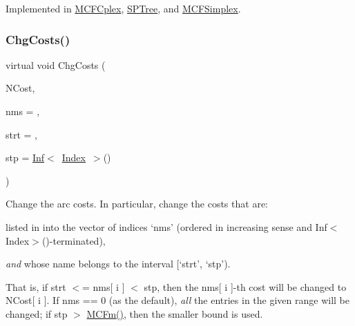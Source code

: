 Implemented in \mbox{\hyperlink{class_m_c_f_cplex_a5b694b932ddb1fc61d9f3d66aaca10e1}{M\+C\+F\+Cplex}}, \mbox{\hyperlink{class_s_p_tree_a5b694b932ddb1fc61d9f3d66aaca10e1}{S\+P\+Tree}}, and \mbox{\hyperlink{class_m_c_f_simplex_a5b694b932ddb1fc61d9f3d66aaca10e1}{M\+C\+F\+Simplex}}.

\mbox{\label{class_m_c_f_class_aedaaa3c7820183c210ff8b1cc716c27d}} 
\subsubsection{\texorpdfstring{Chg\+Costs()}{ChgCosts()}}
{\footnotesize\ttfamily virtual void Chg\+Costs (\begin{DoxyParamCaption}\item[{\mbox{\hyperlink{class_m_c_f_class_ab700102e9ba8bb6015be6818d4e99097}{c\+C\+Row}}}]{N\+Cost,  }\item[{\mbox{\hyperlink{class_m_c_f_class_a81575b2d4e4d5636b17170432150ae69}{c\+Index\+\_\+\+Set}}}]{nms = {},  }\item[{\mbox{\hyperlink{class_m_c_f_class_a76aaabb20535c51a2752b93f6c38fe54}{c\+Index}}}]{strt = {},  }\item[{\mbox{\hyperlink{class_m_c_f_class_ad53d6229d7ec28555a9c9c2fd9abf773}{Index}}}]{stp = {\ttfamily \mbox{\hyperlink{class_o_p_ttypes__di__unipi__it_1_1_inf}{Inf}}$<$~\mbox{\hyperlink{class_m_c_f_class_ad53d6229d7ec28555a9c9c2fd9abf773}{Index}}~$>$()} }\end{DoxyParamCaption})\hspace{0.3cm}{\ttfamily [pure virtual]}}

Change the arc costs. In particular, change the costs that are\+:


\begin{DoxyItemize}
\item listed in into the vector of indices `nms' (ordered in increasing sense and Inf$<$\+Index$>$()-\/terminated),
\item {\itshape and} whose name belongs to the interval \mbox{[}`strt', `stp').
\end{DoxyItemize}

That is, if strt $<$= nms\mbox{[} i \mbox{]} $<$ stp, then the nms\mbox{[} i \mbox{]}-\/th cost will be changed to N\+Cost\mbox{[} i \mbox{]}. If nms == 0 (as the default), {\itshape all} the entries in the given range will be changed; if stp $>$ \mbox{\hyperlink{class_m_c_f_class_ab4d5a0d0fc49882de0b4eb3146f1b7a6}{M\+C\+Fm()}}, then the smaller bound is used.

